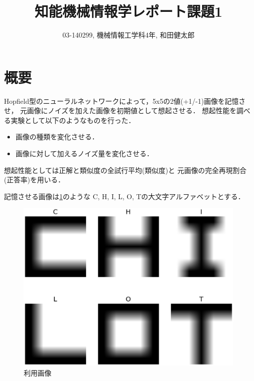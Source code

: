 \documentclass[10pt,twocolumn]{jarticle}
\title{知能機械情報学レポート課題1}
\author{03-140299, 機械情報工学科4年, 和田健太郎}
\newcommand{\figref}[1]{\figurename\ref{fig:#1}}
\begin{document}
\maketitle


\section{概要}
Hopfield型のニューラルネットワークによって，5x5の2値(+1/-1)画像を記憶させ，
元画像にノイズを加えた画像を初期値として想起させる．
想起性能を調べる実験として以下のようなものを行った．
\begin{itemize}
  \item 画像の種類を変化させる．
  \item 画像に対して加えるノイズ量を変化させる．
\end{itemize}

想起性能としては正解と類似度の全試行平均(類似度)と
元画像の完全再現割合(正答率)を用いる．

記憶させる画像は\figref{original-images}のような
C, H, I, L, O, Tの大文字アルファベットとする．
\begin{figure}[htbp]
  \centering
    \includegraphics[width=\columnwidth]{figs/alphabet_images}
    \caption{利用画像}
  \label{fig:original-images}
\end{figure}


\end{document}
